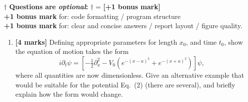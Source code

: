\documentclass[11pt]{article}
\begin{document}
{\footnotesize{$\dagger$ \textbf{Questions are \emph{optional}:} $\dagger$ = \textbf{[+1 bonus mark] } \\  \indent\textbf{+1 bonus mark} for:  code formatting / program structure  \\  \indent \textbf{+1 bonus mark} for: clear and concise answers  / report layout /  figure quality. } }
\begin{enumerate}
\subsection*{Part A }
\item \textbf{[4 marks]} Defining appropriate parameters for length $x_0$, and time $t_0$, show the equation of motion takes the form
\begin{equation}
i  \partial_{t} {\psi} = \left[-\tfrac{1}{2} \partial_x^2 - {V}_0 \left( e^{-({ x} - {a})^2} + e^{-({x} + {a})^2} \right) \right] \psi,
\end{equation}
where all quantities are now dimensionless. Give an alternative example that would be suitable for the potential Eq.~(2) (there are several), and briefly explain how the form would change.


\end{enumerate}
\end{document}
